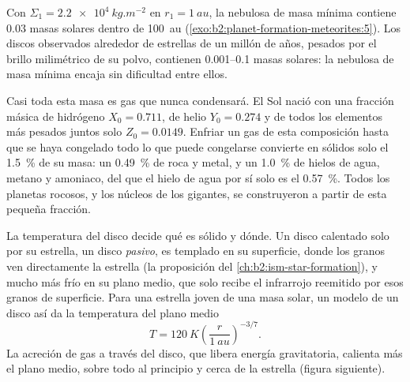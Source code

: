 Con $\Sigma_1 = \qty{2.2e4}{kg.m^{-2}}$ en $r_1 = \qty{1}{au}$, la nebulosa de masa
mínima contiene $0.03$ masas solares dentro de \qty{100}{au} (\cref{exo:b2:planet-formation-meteorites:5}). Los discos
observados alrededor de estrellas de un millón de años, pesados por el brillo milimétrico de
su polvo, contienen \numrange{0.001}{0.1} masas solares: la nebulosa de masa mínima
encaja sin dificultad entre ellos.

Casi toda esta masa es gas que nunca condensará. El Sol nació
con una fracción másica de hidrógeno $X_0 = 0.711$, de helio $Y_0 = 0.274$ y de
todos los elementos más pesados juntos solo $Z_0 = 0.0149$. Enfriar un gas de esta
composición hasta que se haya congelado todo lo que puede congelarse convierte en sólidos solo
el \qty{1.5}{\percent} de su masa: un \qty{0.49}{\percent} de roca y
metal, y un \qty{1.0}{\percent} de hielos de agua, metano y amoniaco, del que el hielo de agua
por sí solo es el \qty{0.57}{\percent}. Todos los planetas rocosos, y los núcleos de los
gigantes, se construyeron a partir de esta pequeña fracción.

La temperatura del disco decide qué es sólido y dónde. Un disco calentado solo por
su estrella, un disco \emph{pasivo}, es templado en su superficie, donde los granos ven
directamente la estrella (la proposición del \cref{ch:b2:ism-star-formation}), y
mucho más frío en su plano medio, que solo recibe el infrarrojo reemitido por
esos granos de superficie. Para una estrella joven de una masa solar, un modelo de un disco así
da la temperatura del plano medio
\[
  T = \qty{120}{K}\left(\frac{r}{\qty{1}{au}}\right)^{-3/7}.
\]
La acreción de gas a través del disco, que libera energía gravitatoria, calienta más
el plano medio, sobre todo al principio y cerca de la estrella (figura siguiente).

